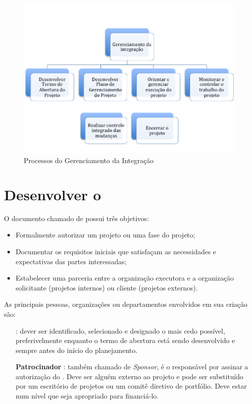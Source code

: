 \begin{figure}[!h]
\centering
\includegraphics[scale=0.75]{Figuras/gerenciamento_integracao.png}
\caption{Processos do Gerenciamento da Integração}
\label{fig:proc:ger:integr}
\end{figure}

\chapter{Desenvolver o \termo}

O documento chamado de \termo possui três objetivos:

\begin{itemize}
	
	\item Formalmente autorizar um projeto ou uma fase do projeto;
	
	\item Documentar os requisitos iniciais que satisfaçam as necessidades e expectativas das partes interessadas;
	
	\item Estabelecer uma parceria entre a organização executora e a organização solicitante (projetos internos) ou cliente (projetos externos).
	
\end{itemize}

As principais pessoas, organizações ou departamentos envolvidos em sua criação são:

\begin{itemize}
	
	\item[\textbf{\gp}]: dever ser identificado, selecionado e designado o mais cedo possível, preferivelmente enquanto o termo de abertura está sendo desenvolvido e sempre antes do início do planejamento.
	
	\item[\textbf{Patrocinador}]: também chamado de \textit{Sponsor}, é o responsável por assinar a autorização do \termo. Deve ser alguém externo ao projeto e pode ser substituído por um escritório de projetos ou um comitê diretivo de portfólio. Deve estar num nível que seja apropriado para financiá-lo. 
	
\end{itemize}

